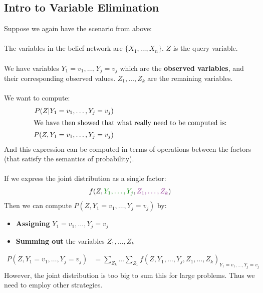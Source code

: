 \documentclass{article}
\def\gre#1{{\color{gre}#1}}
\begin{document}
\subsection*{Intro to Variable Elimination}
Suppose we again have the scenario from above:\\
\\
The variables in the belief network are $ \{X_1, \dots, X_n\} $. $ Z $ is the query variable. \\
\\
We have variables $ Y_1 = v_1, \dots, Y_j = v_j $ which are the \textbf{observed variables}, and their corresponding observed values. $ Z_1, \dots, Z_k $ are the remaining variables. \\
\\
We want to compute:
\begin{align*}
P(Z | Y_1 = v_1, \dots, Y_j = v_j)\\
\intertext{We have then showed that what really need to be computed is:}
P(Z, Y_1 = v_1, \dots, Y_j = v_j)
\end{align*}
And this expression can be computed in terms of operations between the factors (that satisfy the semantics of probability).\\
\\
If we express the joint distribution as a single factor:
\begin{align*}
f(Z, \gre{Y_1, \dots , Y_j}, {\color{Fuchsia}Z_1, \dots, Z_k})
\end{align*}
Then we can compute $ P(Z, Y_1 = v_1, \dots, Y_j = v_j) $ by:\begin{itemize}
	\item \gre{\textbf{Assigning} $ Y_1 = v_1, \dots, Y_j =v_j$}
	\item {\color{Fuchsia}\textbf{Summing out} the variables $ Z_1, \dots, Z_k$}
\end{itemize}
\begin{align*}
P(Z, Y_1 = v_1, \dots, Y_j = v_j) &= \sum_{Z_k} \dots \sum_{Z_1} f(Z, Y_1, \dots , Y_j, Z_1, \dots, Z_k)_{Y_1 = v_1, \dots, Y_j = v_j}
\end{align*}
However, the joint distribution is too big to sum this for large problems. Thus we need to employ other strategies. 
\newpage
\end{document}
